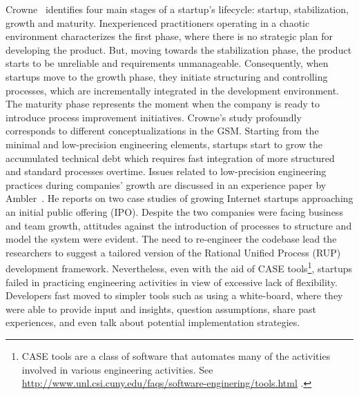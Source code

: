\documentclass[10pt,journal,letterpaper,compsoc]{IEEEtran}
\begin{document}
Crowne~\cite{Crowne2002} identifies four main stages of a startup's lifecycle:
startup, stabilization, growth and maturity. Inexperienced practitioners
operating in a chaotic environment characterizes the first phase, where there is
no strategic plan for developing the product. But, moving towards the
stabilization phase, the product starts to be unreliable and requirements
unmanageable. Consequently, when startups move to the growth phase, they
initiate structuring and controlling processes, which are incrementally
integrated in the development environment. The maturity phase represents the
moment when the company is ready to introduce process improvement initiatives.
Crowne's study profoundly corresponds to different conceptualizations in the
GSM. Starting from the minimal and low-precision engineering elements, startups
start to grow the accumulated technical debt which requires fast integration of
more structured and standard processes overtime. Issues related to low-precision
engineering practices during companies' growth are discussed in an experience
paper by Ambler~\cite{Ambler2002}. He reports on two case studies of growing
Internet startups approaching an initial public offering (IPO). %
Despite the two companies were facing business and team growth, attitudes 
against the introduction of processes to structure and model the system were 
evident. The need to re-engineer the codebase lead the researchers to suggest a 
tailored version of the Rational Unified Process (RUP)
development framework. Nevertheless, even with the aid of CASE 
tools\footnote{CASE tools are a class of software that automates many of the 
activities involved in various engineering activities.
See \url{http://www.unl.csi.cuny.edu/faqs/software-enginering/tools.html} .},
startups failed in practicing engineering activities in view of excessive lack
of flexibility. Developers fast moved to simpler tools such as using a 
white-board, where they were able to provide input and insights, question
assumptions, share past experiences, and even talk about potential
implementation strategies. 
\end{document}
